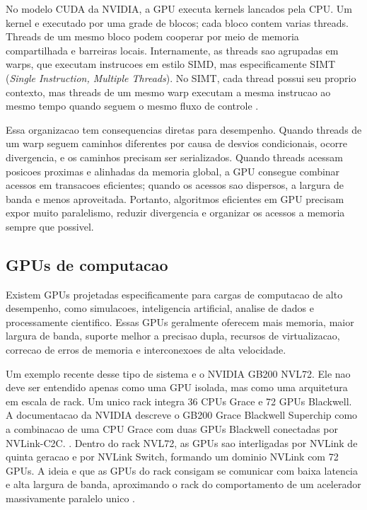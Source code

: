 No modelo CUDA da NVIDIA, a GPU executa kernels lancados pela CPU. Um kernel e
executado por uma grade de blocos; cada bloco contem varias threads. Threads de
um mesmo bloco podem cooperar por meio de memoria compartilhada e barreiras
locais. Internamente, as threads sao agrupadas em warps, que executam instrucoes
em estilo SIMD, mas especificamente SIMT (\textit{Single Instruction, Multiple Threads}). 
No SIMT, cada thread possui seu proprio contexto, mas threads de um mesmo warp executam a mesma
instrucao ao mesmo tempo quando seguem o mesmo fluxo de controle
\cite{cudaguide}.

Essa organizacao tem consequencias diretas para desempenho. Quando threads de um
warp seguem caminhos diferentes por causa de desvios condicionais, ocorre
divergencia, e os caminhos precisam ser serializados. Quando threads acessam
posicoes proximas e alinhadas da memoria global, a GPU consegue combinar acessos
em transacoes eficientes; quando os acessos sao dispersos, a largura de banda e
menos aproveitada. Portanto, algoritmos eficientes em GPU precisam expor muito
paralelismo, reduzir divergencia e organizar os acessos a memoria sempre que
possivel.

\subsection{GPUs de computacao}
Existem GPUs projetadas especificamente para cargas de computacao de alto desempenho, como
simulacoes, inteligencia artificial, analise de dados e processamente cientifico. Essas GPUs 
geralmente oferecem mais memoria, maior
largura de banda, suporte melhor a precisao dupla, recursos de virtualizacao,
correcao de erros de memoria e interconexoes de alta velocidade.


Um exemplo recente desse tipo de sistema e o NVIDIA GB200 NVL72. Ele nao deve ser
entendido apenas como uma GPU isolada, mas como uma arquitetura em escala de rack.
Um unico rack integra 36 CPUs Grace e 72 GPUs Blackwell. A documentacao da
NVIDIA descreve o GB200 Grace Blackwell Superchip como a combinacao de uma CPU
Grace com duas GPUs Blackwell conectadas por NVLink-C2C. .
Dentro do rack NVL72, as GPUs sao interligadas por NVLink de
quinta geracao e por NVLink Switch, formando um dominio NVLink com 72 GPUs. A
ideia e que as GPUs do rack consigam se comunicar com baixa latencia e alta
largura de banda, aproximando o rack do comportamento de um acelerador
massivamente paralelo unico \cite{nvidiagb200nvl72}.

